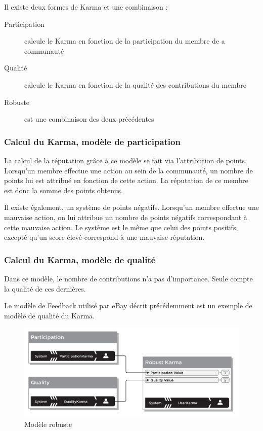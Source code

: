 \documentclass[a4paper, 11pt]{article} %
\begin{document}
Il existe deux formes de Karma et une combinaison :
\begin{description}
	\item[Participation] calcule le Karma en fonction de la participation du membre de a communauté
	\item[Qualité] calcule le Karma en fonction de la qualité des contributions du membre
	\item[Robuste] est une combinaison des deux précédentes
\end{description}

\subsubsection{Calcul du Karma, modèle de participation}
La calcul de la réputation grâce à ce modèle se fait via l'attribution de points. Lorsqu'un membre effectue une action au sein de la communauté, un nombre de points lui est attribué en fonction de cette action. La réputation de ce membre est donc la somme des points obtenus.

Il existe également, un système de points négatifs. Lorsqu'un membre effectue une mauvaise action, on lui attribue un nombre de points négatifs correspondant à cette mauvaise action. Le système est le même que celui des points positifs, excepté qu'un score élevé correspond à une mauvaise réputation.

\subsubsection{Calcul du Karma, modèle de qualité}
Dans ce modèle, le nombre de contributions n'a pas d'importance. Seule compte la qualité de ces dernières. 

Le modèle de Feedback utilisé par eBay décrit précédemment est un exemple de modèle de qualité du Karma.

\begin{figure}
	\begin{center}
		\includegraphics[width=12cm]{karma.png} 
	\end{center}
	\caption{Modèle robuste~\cite{FarmerGlass2010}}
	\label{robusteKarma}
\end{figure}
\end{document}

